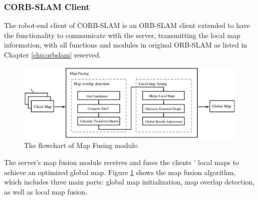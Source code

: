 \subsubsection{CORB-SLAM Client}
The robot-end client of CORB-SLAM is an ORB-SLAM client extended to have the functionality to communicate with the server, transmitting the local map information, with all functions and modules in original ORB-SLAM as listed in Chapter \ref{chp:orbslam} reserved.

\begin{figure}[H]
	\centering
	\includegraphics[width=5in]{Chapter2/corbslamserver.eps}
	\caption{The flowchart of Map Fusing module.}
	\label{fig:corbslamserver} 
\end{figure}

The server's map fusion module receives and fuses the clients ' local maps to achieve an optimized global map. Figure \ref{fig:corbslamserver} shows the map fusion algorithm, which includes three main parts: global map initialization, map overlap detection, as well as local map fusion.

